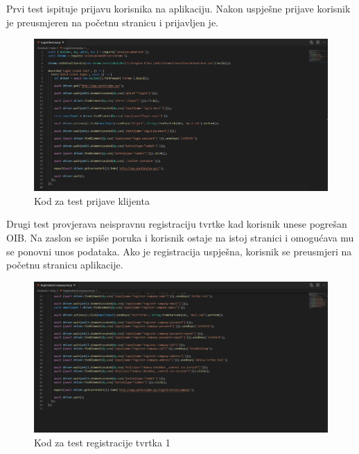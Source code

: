 			Prvi test ispituje prijavu korisnika na aplikaciju. Nakon uspješne prijave korisnik je preusmjeren na početnu stranicu i prijavljen je.
			
			\begin{figure}[H]
				\includegraphics[width=1\linewidth]{images/LoginClient.png}
				\caption{Kod za test prijave klijenta}
				\label{fig:LoginClient test - kod} 
			\end{figure}
			
			
			Drugi test provjerava neispravnu registraciju tvrtke kad korisnik unese pogrešan OIB. Na zaslon se ispiše poruka i korisnik ostaje na istoj stranici i omogućava mu se ponovni unos podataka. Ako je registracija uspješna, korisnik se preusmjeri na početnu stranicu aplikacije.
			
			\begin{figure}[H]
				\includegraphics[width=1\linewidth]{images/RegistrationCompany1.png}
				\caption{Kod za test registracije tvrtka 1}
				\label{fig:RegistrationCompany test - kod1} 
			\end{figure}
			
